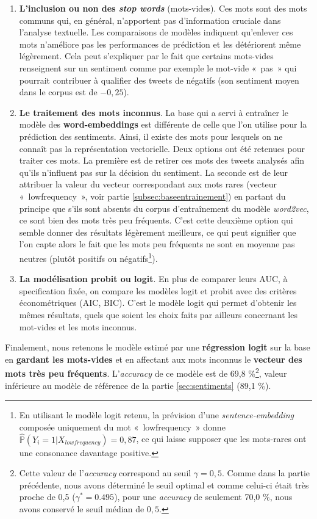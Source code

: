 \documentclass[11pt,french,french]{article}
\let\rmarkdownfootnote\footnote%
\def\footnote{\protect\rmarkdownfootnote}
\begin{document}
\begin{enumerate}
\item \textbf{L’inclusion ou non des \emph{stop words}} (mots-vides). 
Ces mots sont des mots communs qui, en général, n’apportent pas d’information cruciale dans l’analyse textuelle. Les comparaisons de modèles indiquent qu’enlever ces mots n’améliore pas les performances de prédiction et les détériorent même légèrement. Cela peut s’expliquer par le fait que certains mots-vides renseignent sur un sentiment comme par exemple le mot-vide « pas » qui pourrait contribuer à qualifier des tweets de négatifs (son sentiment moyen dans le corpus est de $-0,25$).

\item \textbf{Le traitement des mots inconnus}. La base qui a servi à entraîner le modèle des \textbf{word-embeddings} est différente de celle que l'on utilise pour la prédiction des sentiments.
Ainsi, il existe des mots pour lesquels on ne connaît pas la représentation vectorielle. 
Deux options ont été retenues pour traiter ces mots. 
La première est de retirer ces mots des tweets analysés afin qu'ils n’influent pas sur la décision du sentiment. 
La seconde est de leur attribuer la valeur du vecteur correspondant aux mots rares (vecteur « lowfrequency », voir partie \ref{subsec:baseentrainement}) en partant du principe que s'ils sont absents du corpus d'entraînement du modèle \emph{word2vec}, ce sont bien des mots très peu fréquents. 
C’est cette deuxième option qui semble donner des résultats légèrement meilleurs, ce qui peut signifier que l’on capte alors le fait que les mots peu fréquents ne sont en moyenne pas neutres (plutôt positifs ou négatifs\footnote{En utilisant le modèle logit retenu, la prévision d'une \emph{sentence-embedding} composée uniquement du mot « lowfrequency » donne $\widehat{\mathbb{P}}(Y_i = 1 | X_{lowfrequency}) = 0,87$, ce qui laisse supposer que les mots-rares ont une consonance davantage positive.}). 

\item \textbf{La modélisation probit ou logit}. En plus de comparer leurs AUC, à specification fixée, on compare les modèles logit et probit avec des critères économétriques (AIC, BIC). C’est le modèle logit qui permet d’obtenir les mêmes résultats, quels que soient les choix faits par ailleurs concernant les mot-vides et les mots inconnus.
\end{enumerate}

Finalement, nous retenons le modèle estimé par une \textbf{régression logit} sur la base en \textbf{gardant les mots-vides} et en affectant aux mots inconnus le \textbf{vecteur des mots très peu fréquents}. L'\emph{accuracy} de ce modèle est de 69,8 \%\footnote{Cette valeur de l'\emph{accuracy} correspond au seuil \(\gamma = 0,5\). Comme dans la partie précédente, nous avons déterminé le seuil optimal et comme celui-ci était très proche de 0,5 (\(\gamma^* = 0.495\)), pour une \emph{accuracy} de seulement 70,0 \%, nous avons conservé le seuil médian de \(0,5\).}, valeur inférieure au modèle de référence de la partie \ref{sec:sentiments} (89,1 \%).
\end{document}
